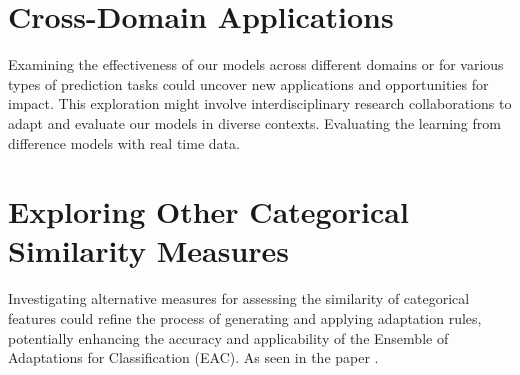 \documentclass[a4paper, 12pt]{report}
\begin{document}
\section{Cross-Domain Applications}
Examining the effectiveness of our models across different domains or for various types of prediction tasks could uncover new applications and opportunities for impact. 
This exploration might involve interdisciplinary research collaborations to adapt and evaluate our models in diverse contexts. 
Evaluating the learning from difference models with real time data.

\section{Exploring Other Categorical Similarity Measures}
Investigating alternative measures for assessing the similarity of categorical features could refine the process of generating and applying adaptation rules, 
potentially enhancing the accuracy and applicability of the Ensemble of Adaptations for Classification (EAC). As seen in the paper \cite{jalali2017learning}.



\end{document}
